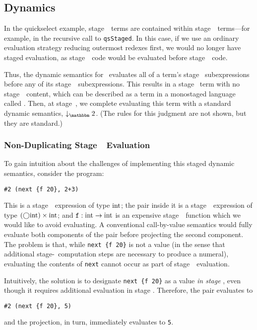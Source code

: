 \subsection{Dynamics}
\label{sec:stagedsemantics}

In the quickselect example, stage~\bbone\ terms are contained within
stage~\bbtwo\ terms---for example, in the recursive call to {\tt qsStaged}. In
this case, if we use an ordinary evaluation strategy reducing outermost redexes
first, we would no longer have staged evaluation, as stage~\bbtwo\ code would
be evaluated before stage~\bbone\ code. 

Thus, the dynamic semantics for \lang\ evaluates all of a term's stage \bbone\
subexpressions before any of its stage~\bbtwo\ subexpressions. This results in
a stage \bbtwo\ term with no stage~\bbone\ content, 
which can be described as a term in a monostaged language called \langTwo. 
Then, at stage~\bbtwo, we complete
evaluating this term with a standard dynamic semantics, $\tworedsym$. (The
rules for this judgment are not shown, but they are standard.)

\subsubsection{Non-Duplicating Stage~\bbone\ Evaluation}

To gain intuition about the challenges of implementing this staged dynamic
semantics, consider the program:
\begin{lstlisting}
#2 (next {f 20}, 2+3)
\end{lstlisting}
This is a stage~\bbone\ expression of type ${\rm int}$; the pair inside it is a
stage~\bbone\ expression of type $(\bigcirc{\rm int})\times{\rm int}$; and ${\tt f} :
{\rm int} \to {\rm int}$ is an expensive stage~\bbtwo\ function which we would like
to avoid evaluating. A conventional call-by-value semantics would fully
evaluate both components of the pair before projecting the second component.
The problem is that, while \verb|next {f 20}| is not a value (in the sense that
additional stage-\bbtwo\ computation steps are necessary to produce a numeral),
evaluating the contents of \verb|next| cannot occur as part of stage~\bbone\
evaluation.

Intuitively, the solution is to designate \verb|next {f 20}| as a value
\emph{in stage \bbone}, even though it requires additional evaluation in stage
\bbtwo. Therefore, the pair evaluates to
\begin{lstlisting}
#2 (next {f 20}, 5)
\end{lstlisting}
and the projection, in turn, immediately evaluates to \verb|5|.

